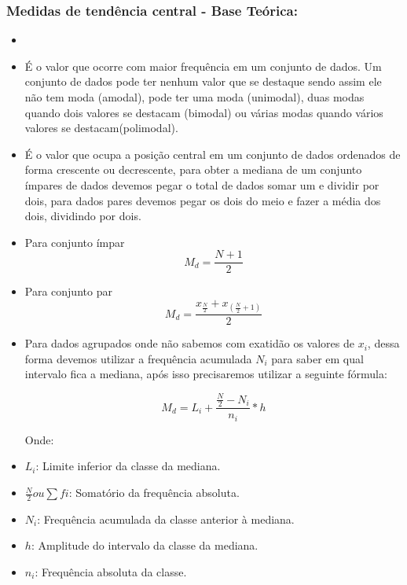 \documentclass[a4paper,11pt]{article}
\begin{document}
\subsubsection*{Medidas de tendência central - Base Teórica:} 

\begin{itemize}
\item[]

    \item É o valor que ocorre com maior frequência em um conjunto de dados. Um conjunto de dados pode ter nenhum valor que se destaque sendo assim ele não tem moda (amodal), pode ter uma moda (unimodal), duas modas quando dois valores se destacam (bimodal) ou várias modas quando vários valores se destacam(polimodal).


    \item É o valor que ocupa a posição central em um conjunto de dados ordenados de forma crescente ou decrescente, para obter a mediana de um conjunto ímpares de dados devemos pegar o total de dados somar um e dividir por dois, para dados pares devemos pegar os dois do meio e fazer a média dos dois, dividindo por dois.

    \item Para conjunto ímpar \[M_d = \frac{N+1}{2}\]
    \item Para conjunto par \[M_d = \frac{x_{\frac{N}{2}} + x_{(\frac{N}{2} + 1)}}{2}\]


    \item Para dados agrupados onde não sabemos com exatidão os valores de $x_i$, dessa forma devemos utilizar a frequência acumulada $N_i$ para saber em qual intervalo fica a mediana, após isso precisaremos utilizar a seguinte fórmula:

    \[M_d = L_i + \frac{\frac{N}{2} - N_i }{n_i} * h\]

    Onde:
    \item $L_i$: Limite inferior da classe da mediana.
    \item $\frac{N}{2} ou \sum fi$: Somatório da frequência absoluta.
    \item $N_i$: Frequência acumulada da classe anterior à mediana.
    \item $h$: Amplitude do intervalo da classe da mediana.
    \item $n_i$: Frequência absoluta da classe.




\end{itemize}
\end{document}
